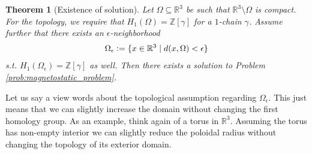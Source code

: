 \documentclass[12pt,a4paper]{article}
\numberwithin{equation}{subsection}
\numberwithin{lemma}{subsection}
\newtheorem{theorem}[lemma]{Theorem}
\theoremstyle{definition}
\newcommand{\integers}{\mathbb{Z}}
\newcommand{\real}{\mathbb{R}}
\begin{document}
\begin{theorem}[Existence of solution]\label{thm:existence}
    Let $\Omega \subseteq \real^3$ be such that $\real^3 \setminus \Omega$
    is compact. 
    For the topology, we require that $H_1(\Omega) = \integers [\gamma]$ 
    for a $1$-chain 
    $\gamma$. Assume further that there exists an $\epsilon$-neighborhood 
    \begin{align*}
        \Omega_\epsilon \vcentcolon= \{ x \in \real^3 \mid
            d(x,\Omega) < \epsilon \} 
    \end{align*}
    s.t. $H_1(\Omega_\epsilon) = \integers [\gamma]$ as well.
    Then there exists a solution 
    to Problem \ref{prob:magnetostatic_problem}.
\end{theorem}
Let us say a view words about the topological assumption 
regarding $\Omega_\epsilon$. This just means that we can slightly increase 
the domain without changing the first homology group. As an example, 
think again of a torus in $\real^3$. Assuming the torus has non-empty interior 
we can slightly reduce the poloidal radius without changing the topology of its 
 exterior domain.
\end{document}
